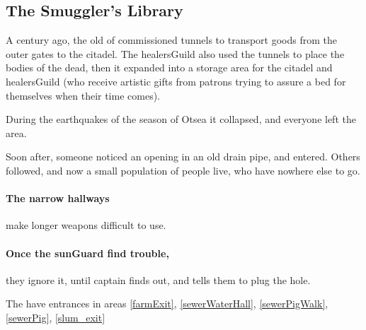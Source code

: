 \subsection[Smuggler's Library]{The Smuggler's Library}
\label{sewers}

A century ago, the old  of  commissioned tunnels to transport goods from the outer gates to the citadel.
The \gls{healersGuild} also used the tunnels to place the bodies of the dead, then it expanded into a storage area for the citadel and \gls{healersGuild} (who receive artistic gifts from patrons trying to assure a bed for themselves when their time comes).

During the earthquakes of the season of Otsea%
it collapsed, and everyone left the area.

Soon after, someone noticed an opening in an old drain pipe, and entered.
Others followed, and now a small population of people live, who have nowhere else to go.

\paragraph{The narrow hallways}
make longer weapons difficult to use.%

\paragraph{Once the \gls{sunGuard} find trouble,}
they ignore it, until \gls{captain} finds out, and tells them to plug the hole.

The  have entrances in areas \ref{farmExit}, \ref{sewerWaterHall}, \ref{sewerPigWalk}, \ref{sewerPig}, \ref{slum_exit}



